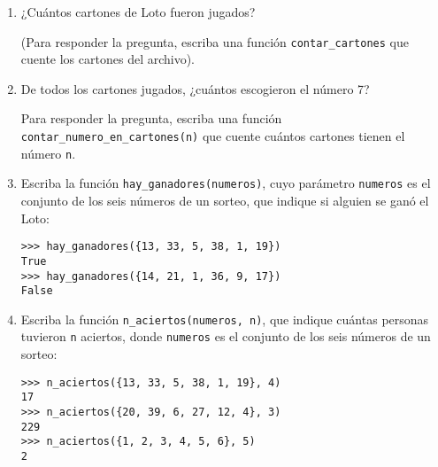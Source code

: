 \begin{enumerate}
\item
  ¿Cuántos cartones de Loto fueron jugados?

  (Para responder la pregunta, escriba una función
  \lstinline!contar_cartones! que cuente los cartones del archivo).
\item
  De todos los cartones jugados, ¿cuántos escogieron el número 7?

  Para responder la pregunta, escriba una función
  \lstinline!contar_numero_en_cartones(n)! que cuente cuántos cartones
  tienen el número \lstinline!n!.
\item
  Escriba la función \lstinline!hay_ganadores(numeros)!, cuyo parámetro
  \lstinline!numeros! es el conjunto de los seis números de un sorteo,
  que indique si alguien se ganó el Loto:

\begin{lstlisting}
>>> hay_ganadores({13, 33, 5, 38, 1, 19})
True
>>> hay_ganadores({14, 21, 1, 36, 9, 17})
False
\end{lstlisting}
\item
  Escriba la función \lstinline!n_aciertos(numeros, n)!, que indique
  cuántas personas tuvieron \lstinline!n! aciertos, donde
  \lstinline!numeros! es el conjunto de los seis números de un sorteo:

\begin{lstlisting}
>>> n_aciertos({13, 33, 5, 38, 1, 19}, 4)
17
>>> n_aciertos({20, 39, 6, 27, 12, 4}, 3)
229
>>> n_aciertos({1, 2, 3, 4, 5, 6}, 5)
2
\end{lstlisting}
\end{enumerate}
